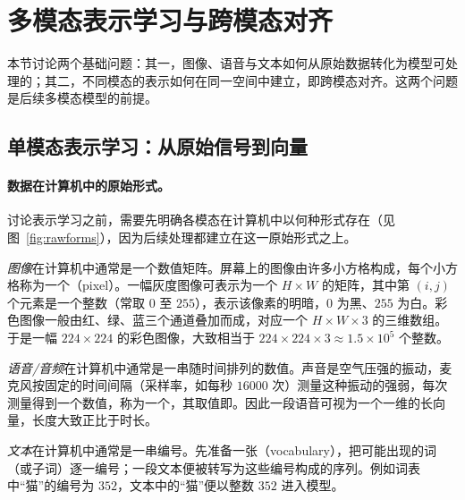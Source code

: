 \section{多模态表示学习与跨模态对齐}
\label{sec:repr}

本节讨论两个基础问题：其一，图像、语音与文本如何从原始数据转化为模型可处理的；其二，不同模态的表示如何在同一空间中建立，即跨模态对齐。这两个问题是后续多模态模型的前提。

\subsection{单模态表示学习：从原始信号到向量}
\label{sub:encode}

\paragraph{数据在计算机中的原始形式。}讨论表示学习之前，需要先明确各模态在计算机中以何种形式存在（见图~\ref{fig:rawforms}），因为后续处理都建立在这一原始形式之上。

\emph{图像}在计算机中通常是一个数值矩阵。屏幕上的图像由许多小方格构成，每个小方格称为一个（pixel）。一幅灰度图像可表示为一个 $H\times W$ 的矩阵，其中第 $(i,j)$ 个元素是一个整数（常取 $0$ 至 $255$），表示该像素的明暗，$0$ 为黑、$255$ 为白。彩色图像一般由红、绿、蓝三个通道叠加而成，对应一个 $H\times W\times 3$ 的三维数组。于是一幅 $224\times224$ 的彩色图像，大致相当于 $224\times224\times3\approx 1.5\times10^{5}$ 个整数。

\emph{语音/音频}在计算机中通常是一串随时间排列的数值。声音是空气压强的振动，麦克风按固定的时间间隔（采样率，如每秒 $16000$ 次）测量这种振动的强弱，每次测量得到一个数值，称为一个，其取值即。因此一段语音可视为一个一维的长向量，长度大致正比于时长。

\emph{文本}在计算机中通常是一串编号。先准备一张（vocabulary），把可能出现的词（或子词）逐一编号；一段文本便被转写为这些编号构成的序列。例如词表中“猫”的编号为 $352$，文本中的“猫”便以整数 $352$ 进入模型。


